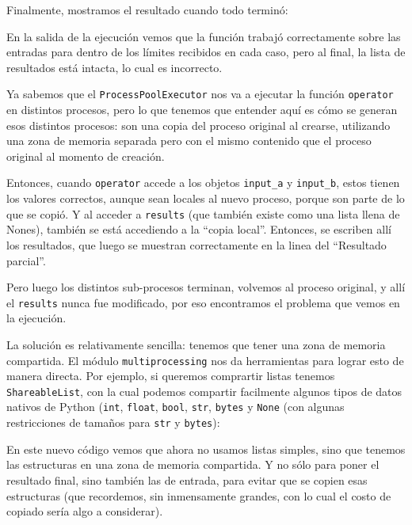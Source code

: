 Finalmente, mostramos el resultado cuando todo terminó:


En la salida de la ejecución vemos que la función trabajó correctamente sobre las entradas para dentro de los límites recibidos en cada caso, pero al final, la lista de resultados está intacta, lo cual es incorrecto.

Ya sabemos que el \texttt{ProcessPoolExecutor} nos va a ejecutar la función \texttt{operator} en distintos procesos, pero lo que tenemos que entender aquí es cómo se generan esos distintos procesos: son una copia del proceso original al crearse, utilizando una zona de memoria separada pero con el mismo contenido que el proceso original al momento de creación.

Entonces, cuando \texttt{operator} accede a los objetos \texttt{input\_a} y \texttt{input\_b}, estos tienen los valores correctos, aunque sean locales al nuevo proceso, porque son parte de lo que se copió. Y al acceder a \texttt{results} (que también existe como una lista llena de Nones), también se está accediendo a la ``copia local''. Entonces, se escriben allí los resultados, que luego se muestran correctamente en la linea del ``Resultado parcial''.

Pero luego los distintos sub-procesos terminan, volvemos al proceso original, y allí el \texttt{results} nunca fue modificado, por eso encontramos el problema que vemos en la ejecución.

La solución es relativamente sencilla: tenemos que tener una zona de memoria compartida. El módulo \texttt{multiprocessing} nos da herramientas para lograr esto de manera directa. Por ejemplo, si queremos comprartir listas tenemos \texttt{ShareableList}, con la cual podemos compartir facilmente algunos tipos de datos nativos de Python (\texttt{int}, \texttt{float}, \texttt{bool}, \texttt{str}, \texttt{bytes} y \texttt{None} (con algunas restricciones de tamaños para \texttt{str} y \texttt{bytes}):


En este nuevo código vemos que ahora no usamos listas simples, sino que tenemos las estructuras en una zona de memoria compartida. Y no sólo para poner el resultado final, sino también las de entrada, para evitar que se copien esas estructuras (que recordemos, sin inmensamente grandes, con lo cual el costo de copiado sería algo a considerar).

